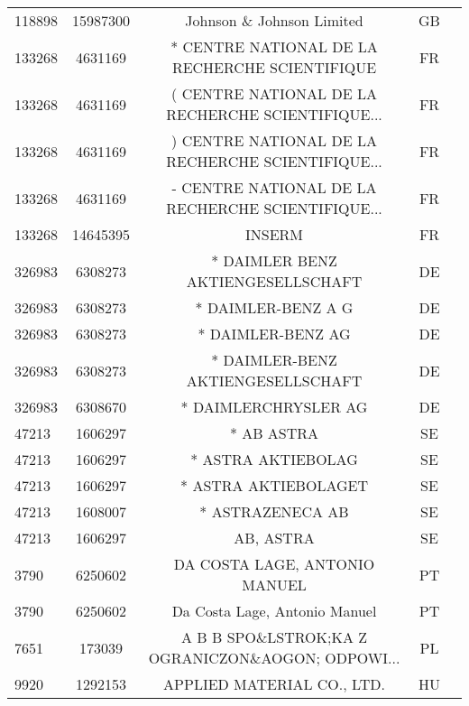 \begin{longtable}{|l|c|c|c|c|}
    118898 &   15987300 &                          Johnson \& Johnson Limited &      GB \\
    133268 &    4631169 &     * CENTRE NATIONAL DE LA RECHERCHE SCIENTIFIQUE &      FR \\
    133268 &    4631169 &  ( CENTRE NATIONAL DE LA RECHERCHE SCIENTIFIQUE... &      FR \\
    133268 &    4631169 &  ) CENTRE NATIONAL DE LA RECHERCHE SCIENTIFIQUE... &      FR \\
    133268 &    4631169 &  - CENTRE NATIONAL DE LA RECHERCHE SCIENTIFIQUE... &      FR \\
    133268 &   14645395 &                                             INSERM &      FR \\
    326983 &    6308273 &                  * DAIMLER BENZ AKTIENGESELLSCHAFT &      DE \\
    326983 &    6308273 &                                 * DAIMLER-BENZ A G &      DE \\
    326983 &    6308273 &                                  * DAIMLER-BENZ AG &      DE \\
    326983 &    6308273 &                  * DAIMLER-BENZ AKTIENGESELLSCHAFT &      DE \\
    326983 &    6308670 &                               * DAIMLERCHRYSLER AG &      DE \\
     47213 &    1606297 &                                         * AB ASTRA &      SE \\
     47213 &    1606297 &                                 * ASTRA AKTIEBOLAG &      SE \\
     47213 &    1606297 &                               * ASTRA AKTIEBOLAGET &      SE \\
     47213 &    1608007 &                                   * ASTRAZENECA AB &      SE \\
     47213 &    1606297 &                                          AB, ASTRA &      SE \\
      3790 &    6250602 &                      DA COSTA LAGE, ANTONIO MANUEL &      PT \\
      3790 &    6250602 &                      Da Costa Lage, Antonio Manuel &      PT \\
      7651 &     173039 &  A B B SPO\&LSTROK;KA Z OGRANICZON\&AOGON; ODPOWI... &      PL \\
      9920 &    1292153 &                         APPLIED MATERIAL CO., LTD. &      HU \\

\end{longtable}
